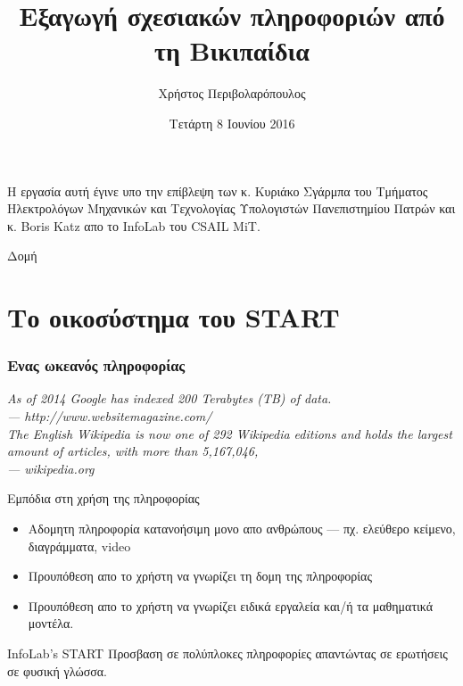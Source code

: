 \documentclass[bigger]{beamer}
\author{Χρήστος Περιβολαρόπουλος}
\date{Τετάρτη 8 Ιουνίου 2016}
\title{Εξαγωγή σχεσιακών πληροφοριών από τη Βικιπαίδια}
\begin{document}
\maketitle

\begin{frame}
  Η εργασία αυτή έγινε υπο την επίβλεψη των κ. Κυριάκο Σγάρμπα του
  Τμήματος Ηλεκτρολόγων Μηχανικών και Τεχνολογίας Υπολογιστών
  Πανεπιστημίου Πατρών και κ. Boris Katz απο το InfoLab του CSAIL MiT.
\end{frame}

\begin{frame}{Δομή}
  \tableofcontents
\end{frame}

\section{Το οικοσύστημα του START}
\begin{frame}
  \frametitle{Ενας ωκεανός πληροφορίας}
  \textit{As of 2014 Google has indexed 200 Terabytes (TB) of data. \\
    \hfill --- http://www.websitemagazine.com/} \\

  \vfill
  \textit{The English Wikipedia is now one of 292 Wikipedia
    editions and holds the largest amount of articles, with more than
    5,167,046, \\ \hfill --- wikipedia.org }

  \vfiil
\end{frame}

\begin{frame}[fragile]{Εμπόδια στη χρήση της πληροφορίας}
  \begin{itemize}
  \item Αδομητη πληροφορία κατανοήσιμη μονο απο ανθρώπους ---
    πχ. ελεύθερο κείμενο, διαγράμματα, video
  \item Προυπόθεση απο το χρήστη να γνωρίζει τη δομη της πληροφορίας
  \item Προυπόθεση απο το χρήστη να γνωρίζει ειδικά εργαλεία και/ή τα
    μαθηματικά μοντέλα.
  \end{itemize}
\end{frame}

\begin{frame}[fragile]{InfoLab's START}
  Προσβαση σε πολύπλοκες πληροφορίες απαντώντας σε ερωτήσεις σε φυσική
  γλώσσα.
\end{frame}
\end{document}
